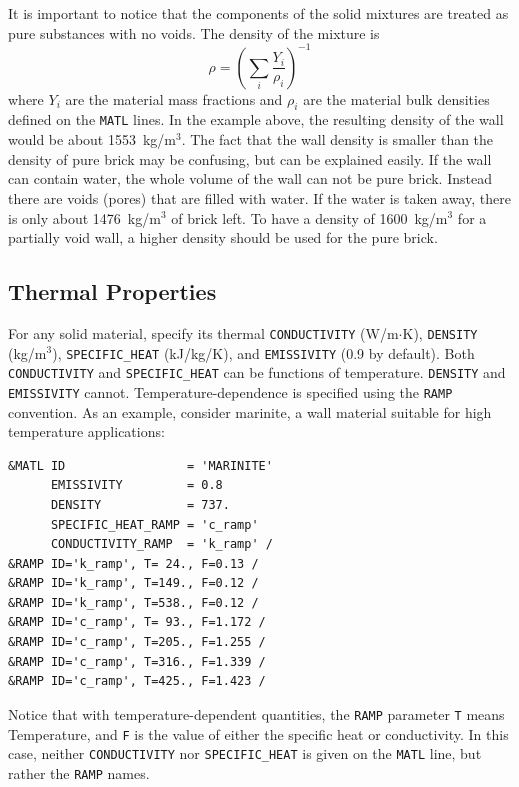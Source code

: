 \documentclass[11pt]{book}
\newcommand{\ct}{\tt\small}
\newcommand{\be}{\begin{equation}}
\newcommand{\ee}{\end{equation}}
\begin{document}
It is important to notice that the components of the solid mixtures
are treated as pure substances with no voids. The density of the
mixture is
\be
\rho = \left(\sum_i\frac{Y_i}{\rho_i}\right)^{-1}
\ee
where $Y_i$ are the material mass fractions and $\rho_i$ are the
material bulk densities defined on the {\ct MATL} lines. In the
example above, the resulting density of the wall would be about
1553~kg/m$^3$. The fact that the wall density is smaller than the
density of pure brick may be confusing, but can be explained easily.
If the wall can contain water, the whole volume of the wall can not be
pure brick. Instead there are voids (pores) that are
filled with water. If the water is taken away, there is only about
1476~kg/m$^3$ of brick left. To have a density of 1600~kg/m$^3$ for a
partially void wall, a higher density should be used for the pure
brick.

\subsection{Thermal Properties}

\label{info:thermal_properties}

For any solid material, specify its thermal
{\ct CONDUCTIVITY} (W/m$\cdot$K), {\ct DENSITY} (kg/m$^3$),
{\ct SPECIFIC\_HEAT} (kJ/kg/K), and {\ct EMISSIVITY} (0.9 by default).
Both {\ct CONDUCTIVITY} and {\ct SPECIFIC\_HEAT} can be functions of
temperature. {\ct DENSITY} and {\ct EMISSIVITY} cannot.
Temperature-dependence is specified using the {\ct RAMP} convention.
As an example, consider marinite, a wall material suitable for high temperature applications:

\footnotesize
\begin{verbatim}
&MATL ID                 = 'MARINITE'
      EMISSIVITY         = 0.8
      DENSITY            = 737.
      SPECIFIC_HEAT_RAMP = 'c_ramp'
      CONDUCTIVITY_RAMP  = 'k_ramp' /
&RAMP ID='k_ramp', T= 24., F=0.13 /
&RAMP ID='k_ramp', T=149., F=0.12 /
&RAMP ID='k_ramp', T=538., F=0.12 /
&RAMP ID='c_ramp', T= 93., F=1.172 /
&RAMP ID='c_ramp', T=205., F=1.255 /
&RAMP ID='c_ramp', T=316., F=1.339 /
&RAMP ID='c_ramp', T=425., F=1.423 /
\end{verbatim}
\normalsize
Notice that with temperature-dependent quantities, the {\ct RAMP} parameter
{\ct T} means Temperature, and {\ct F} is the value of either
the specific heat or conductivity. In this case, neither {\ct CONDUCTIVITY} nor {\ct SPECIFIC\_HEAT} is given on the
{\ct MATL} line, but rather the {\ct RAMP} names.
\end{document}
